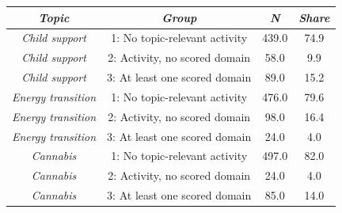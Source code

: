 \begin{tabular}{c c c c}
      \hline
      \textit{Topic} & \textit{Group} & \textit{N} & \textit{Share} \\
      \hline
      \textit{Child support} & 1: No topic-relevant activity & 439.0 & 74.9 \\
      \textit{Child support} & 2: Activity, no scored domain & 58.0 & 9.9 \\
      \textit{Child support} & 3: At least one scored domain & 89.0 & 15.2 \\
      \textit{Energy transition} & 1: No topic-relevant activity & 476.0 & 79.6 \\
      \textit{Energy transition} & 2: Activity, no scored domain & 98.0 & 16.4 \\
      \textit{Energy transition} & 3: At least one scored domain & 24.0 & 4.0 \\
      \textit{Cannabis} & 1: No topic-relevant activity & 497.0 & 82.0 \\
      \textit{Cannabis} & 2: Activity, no scored domain & 24.0 & 4.0 \\
      \textit{Cannabis} & 3: At least one scored domain & 85.0 & 14.0 \\
      \hline
    \end{tabular}
